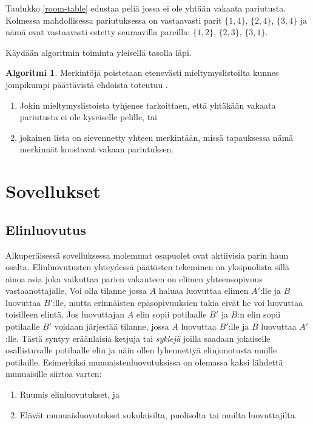 \documentclass[finnish]{tktltiki2}
\theoremstyle{definition}
\newtheorem{alg}[lau]{Algoritmi}
\theoremstyle{remark}
\begin{document}
Taulukko \ref{room-table} edustaa peliä jossa ei ole yhtään vakaata pariutusta. Kolmessa mahdollisessa pariutuksessa on vastaavasti parit $\{1,4\}$, $\{2,4\}$, $\{3,4\}$ ja nämä ovat vastaavasti estetty seuraavilla pareilla: $\{1,2\}$, $\{2,3\}$, $\{3,1\}$.

Käydään algoritmin toiminta yleisellä tasolla läpi. 
\begin{alg}\label{srp1}
Merkintöjä poistetaan etenevästi mieltymyslistoilta kunnes jompikumpi päättävistä ehdoista toteutuu \cite{gusfield1989stable}.
\begin{enumerate}
	\item Jokin mieltymyslistoista tyhjenee tarkoittaen, että yhtäkään vakaata pariutusta ei ole kyseiselle pelille, tai
	\item jokainen lista on sievennetty yhteen merkintään, missä tapauksessa nämä merkinnät koostavat vakaan pariutuksen.
\end{enumerate}
\end{alg}

\section{Sovellukset}
\subsection{Elinluovutus}
Alkuperäisessä sovelluksessa molemmat osapuolet ovat aktiivisia parin haun osalta. Elinluovutusten yhteydessä päätösten tekeminen on yksipuolista sillä ainoa asia joka vaikuttaa parien vakauteen on elimen yhteensopivuus vastaanottajalle. Voi olla tilanne jossa $A$ haluaa luovuttaa elimen $A'$:lle ja $B$ luovuttaa $B'$:lle, mutta erinnäisten epäsopivuuksien takia eivät he voi luovuttaa toisilleen elintä. Jos luovuttajan $A$ elin sopii potilaalle $B'$ ja $B$:n elin sopii potilaalle $B'$ voidaan järjestää tilanne, jossa $A$ luovuttaa $B'$:lle ja $B$ luovuttaa $A'$:lle. Tästä syntyy eräänlaisia ketjuja tai \emph{syklejä} joilla saadaan jokaiselle osallistuvalle potilaalle elin ja näin ollen lyhennettyä elinjonotusta muille potilaille.
Esimerkiksi munuaistenluovutuksissa on olemassa kaksi lähdettä munuaisille siirtoa varten:
\begin{enumerate}
	\item Ruumis elinluovutukset, ja
	\item Elävät munuaisluovutukset sukulaisilta, puolisolta tai muilta luovuttajilta. \cite{NBERw10002}
\end{enumerate}
\end{document}
